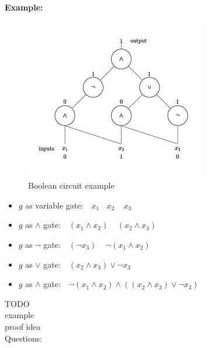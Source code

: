 \documentclass[a4]{scrartcl}
\begin{document}
\textbf{Example:} \\
\begin{minipage}{0.4\textwidth}

\begin{figure}[H]
\begin{center}
\includegraphics[scale=0.6]{booleanC.jpg}
\end{center}
\caption{Boolean circuit example \cite{booleanC}}
\end{figure}

\end{minipage}\begin{minipage}{0.6\textwidth}

\begin{itemize}
\item $g$ as variable gate: $\ \ \ x_1 \ \ \ \  x_2 \ \ \ \ \ x_3$
\item $g$ as $\wedge$ gate: $\ \ \ (x_1 \wedge x_2) \ \ \ \ \ (x_2 \wedge x_3)$
\item $g$ as $\lnot$ gate: $\ \ \ (\lnot x_3) \ \ \ \ \ \lnot (x_1 \wedge x_2)$
\item $g$ as $\vee$ gate: $\ \ \ (x_2 \wedge x_3) \vee \lnot x_3$
\item $g$ as $\wedge$ gate: $\ \ \ \lnot(x_1 \wedge x_2) \wedge ((x_2 \wedge x_3) \vee \lnot x_3)$
\end{itemize}

\end{minipage}








\color{red} TODO \\
example \\
proof idea \\
\color{black}
\color{violet} Questions:
\color{black}
\end{document}

